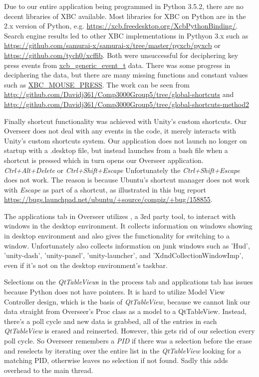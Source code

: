 \documentclass[12pt]{article}
\begin{document}
Due to our entire application being programmed in Python 3.5.2, there are no decent libraries of XBC available.
Most libraries for XBC on Python are in the 2.x version of Python, e.g. \url{https://xcb.freedesktop.org/XcbPythonBinding/}.
Search engine results led to other XBC implementations in Pythyon 3.x such as \url{https://github.com/samurai-x/samurai-x/tree/master/pyxcb/pyxcb} or \url{https://github.com/tych0/xcffib}.
Both were unsuccessful for deciphering key press events from \url{xcb_generic_event_t} data.
There was some progress in deciphering the data, but there are many missing functions and constant values such as \url{XBC_MOUSE_PRESS}. The work can be seen from \url{http://github.com/Davidj361/Comp3000Group5/tree/global-shortcuts} and \url{http://github.com/Davidj361/Comp3000Group5/tree/global-shortcuts-method2}

Finally shortcut functionality was achieved with Unity's custom shortcuts.
Our Overseer does not deal with any events in the code, it merely interacts with Unity's custom shortcuts system.
Our application does not launch no longer on startup with a .desktop file, but instead launches from a bash file when a shortcut is pressed which in turn opens our Overseer application.
\emph{Ctrl+Alt+Delete} or \emph{Ctrl+Shift+Escape}
Unfortunately the \emph{Ctrl+Shift+Escape} does not work.
The reason is because Ubuntu's shortcut manager does not work with \emph{Escape} as part of a shortcut, as illustrated in this bug report \url{https://bugs.launchpad.net/ubuntu/+source/compiz/+bug/158855}.

The applications tab in Overseer utilizes , a 3rd party tool, to interact with windows in the desktop environment.
It collects information on windows showing in desktop environment and also gives the functionality for switching to a window.
Unfortunately  also collects information on junk windows such as 'Hud', 'unity-dash', 'unity-panel', 'unity-launcher', and 'XdndCollectionWindowImp', even if it's not on the desktop environment's taskbar.

Selections on the \emph{QtTableView}s in the process tab and applications tab has issues because Python does not have pointers.
It is hard to utilize Model View Controller design, which is the basis of \emph{QtTableView}, because we cannot link our data straight from Overseer's Proc class as a model to a QtTableView.
Instead, there's a poll cycle and new data is grabbed, all of the entries in each \emph{QtTableView} is erased and reinserted.
However, this gets rid of our selection every poll cycle. 
So Overseer remembers a \emph{PID} if there was a selection before the erase and reselects by iterating over the entire list in the \emph{QtTableView} looking for a matching PID, otherwise leaves no selection if not found.
Sadly this adds overhead to the main thread.	
	
\end{document}
